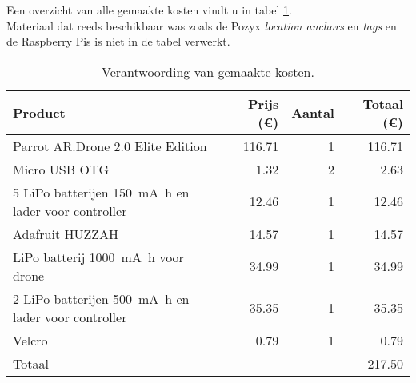 Een overzicht van alle gemaakte kosten vindt u in tabel \ref{tab:kosten}.\\
Materiaal dat reeds beschikbaar was zoals de Pozyx \textit{location anchors} en \textit{tags} en de Raspberry Pis is niet in de tabel verwerkt.
\begin{table}[p]
\centering
\begin{tabular}{ |l|r|r|r| } \hline
Product & Prijs (\euro{}) & Aantal & Totaal (\euro{}) \\ [.5ex] \hline \hline
Parrot AR.Drone 2.0 Elite Edition & 116.71 & 1 & 116.71 \\ \hline
Micro USB OTG & 1.32 & 2 & 2.63 \\ \hline
5 LiPo batterijen \SI{150}{\mA\hour} en lader voor controller & 12.46 & 1 & 12.46 \\ \hline
Adafruit HUZZAH & 14.57 & 1 & 14.57 \\ \hline
LiPo batterij \SI{1000}{\mA\hour} voor drone & 34.99 & 1 & 34.99 \\ \hline
2 LiPo batterijen \SI{500}{\mA\hour} en lader voor controller & 35.35 & 1 & 35.35 \\ [.5ex] \hline
Velcro & 0.79 & 1 & 0.79 \\ \hline
\hline
Totaal & & & 217.50 \\ \hline
\end{tabular}
\caption[Kosten]{Verantwoording van gemaakte kosten.}
\label{tab:kosten}
\end{table}